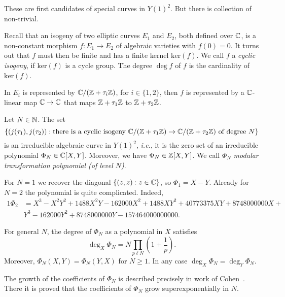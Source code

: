 These are first candidates of special curves in $Y(1)^2$. 
But there is collection of non-trivial.

Recall that an isogeny of two elliptic curves $E_1$ and $E_2$, both
defined over ${\mathbb{C}}$, is a non-constant morphism $f\colon E_1\rightarrow
E_2$ of algebraic varieties with $f(0)=0$. It turns out that $f$ must
then be finite and has a finite kernel $\mathrm{ker}(f)$.
We call $f$ a \emph{cyclic isogeny}, if $\mathrm{ker}(f)$ is a cycle
group. The degree $\deg f$ of $f$ is the cardinality of $\mathrm{ker}(f)$. 

In $E_i$ is represented by ${\mathbb{C}}/({\mathbb{Z}}+\tau_i{\mathbb{Z}})$, for $i\in \{1,2\}$,
then $f$ is represented by a ${\mathbb{C}}$-linear map ${\mathbb{C}}\rightarrow{\mathbb{C}}$ that
maps ${\mathbb{Z}}+\tau_1{\mathbb{Z}}$ to ${\mathbb{Z}}+\tau_2{\mathbb{Z}}$.

\begin{deflemma}
  \label{deflem:modtranspoly}
  Let $N\in{\mathbb{N}}$. The set
  \begin{equation*}
    \left\{ (j(\tau_1),j(\tau_2)) : \text{there is a cyclic isogeny 
        ${\mathbb{C}}/({\mathbb{Z}}+\tau_1{\mathbb{Z}})\rightarrow {\mathbb{C}}/({\mathbb{Z}}+\tau_2{\mathbb{Z}})$ of degree $N$}\right\}
  \end{equation*}
  is an irreducible algebraic curve in $Y(1)^2$, \textit{i.e.}, it is
  the zero set of an irreducible polynomial $\Phi_N\in{\mathbb{C}}[X,Y]$.
  Moreover, we have $\Phi_N\in{\mathbb{Z}}[X,Y]$. We call $\Phi_N$
  \emph{modular transformation polynomial (of level $N$)}.
\end{deflemma}

\begin{example}
  For $N=1$ we recover the diagonal $\{(z,z) : z\in{\mathbb{C}}\}$, so $\Phi_1
  = X-Y$. 
  Already for $N=2$ the polynomial is quite complicated. Indeed,
  \begin{alignat*}1
    \Phi_2 &= 
    X^3 - X^2Y^2 + 1488X^2Y - 162000X^2 + 1488XY^2+ 40773375XY +
    8748000000X + \\
    &Y^3 - 162000Y^2 + 8748000000Y -157464000000000.    
  \end{alignat*}

  For general $N$, the degree of $\Phi_N$ as a polynomial in $X$
  satisfies
  \begin{equation*}
    \deg_X \Phi_N = N\prod_{p\ell N}\left(1+\frac 1p\right). 
  \end{equation*}
  Moreover, $\Phi_N(X,Y) = \Phi_N(Y,X)$ for $N\ge 1$. In any case
  $\deg_X \Phi_N = \deg_Y \Phi_N$.

  The growth of the coefficients of $\Phi_N$ is described precisely in
  work of Cohen~\cite{Cohen}. There it is proved that the
  coefficients of $\Phi_N$ grow superexponentially in $N$. 
\end{example}

